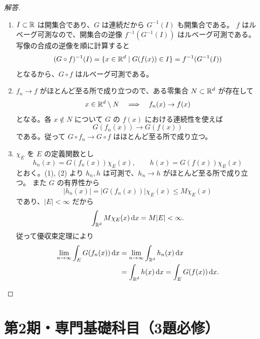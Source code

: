 \begin{proof}[解答]
\begin{enumerate}
  \item[(1)] $I\subset\mathbb{R}$ は開集合であり、$G$ は連続だから $G^{-1}(I)$ も開集合である。
  $f$ はルベーグ可測なので、開集合の逆像 $f^{-1}(G^{-1}(I))$ はルベーグ可測である。
  写像の合成の逆像を順に計算すると
  \[
  (G\circ f)^{-1}(I)
  =\{x\in\mathbb{R}^d\mid G(f(x))\in I\}
  =f^{-1}(G^{-1}(I))
  \]
  となるから、$G\circ f$ はルベーグ可測である。

  \item[(2)] $f_n\to f$ がほとんど至る所で成り立つので、ある零集合 $N\subset\mathbb{R}^d$ が存在して
  \[
  x\in\mathbb{R}^d\setminus N\quad\Longrightarrow\quad f_n(x)\to f(x)
  \]
  となる。各 $x\notin N$ について $G$ の $f(x)$ における連続性を使えば
  \[
  G(f_n(x))\longrightarrow G(f(x))
  \]
  である。従って $G\circ f_n\to G\circ f$ はほとんど至る所で成り立つ。

  \item[(3)] $\chi_E$ を $E$ の定義関数とし
  \[
  h_n(x)=G(f_n(x))\chi_E(x),
  \qquad h(x)=G(f(x))\chi_E(x)
  \]
  とおく。(1), (2) より $h_n,h$ は可測で、$h_n\to h$ がほとんど至る所で成り立つ。
  また $G$ の有界性から
  \[
  |h_n(x)|=|G(f_n(x))|\chi_E(x)
  \le M\chi_E(x)
  \]
  であり、$|E|<\infty$ だから
  \[
  \int_{\mathbb{R}^d}M\chi_E(x)\,\mathrm{d} x=M|E|<\infty.
  \]
  従って優収束定理により
  \begin{align*}
  \lim_{n\to\infty}\int_EG(f_n(x))\,\mathrm{d} x
  &=\lim_{n\to\infty}\int_{\mathbb{R}^d}h_n(x)\,\mathrm{d} x\\
  &=\int_{\mathbb{R}^d}h(x)\,\mathrm{d} x
  =\int_EG(f(x))\,\mathrm{d} x.
  \end{align*}
\end{enumerate}
\end{proof}

\section{第2期・専門基礎科目（3題必修）}

